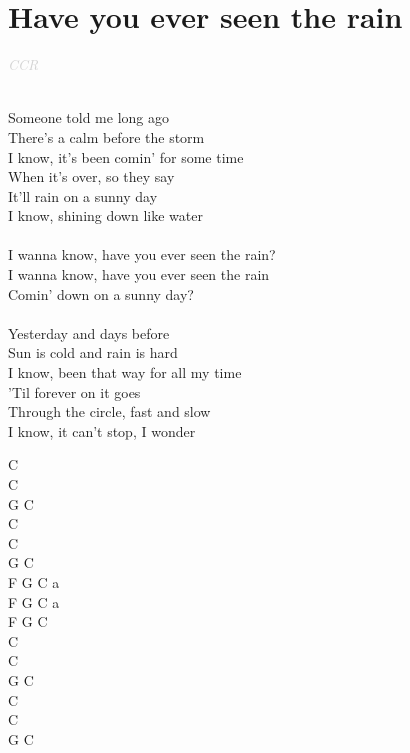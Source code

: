 \documentclass[a5paper, 10pt]{book}
\begin{document}
\section{Have you ever seen the rain}\textcolor{lightgray}{\textit{CCR}}\\~\\
\begin{minipage}[t]{0.7\textwidth}
Someone told me long ago\\
There's a calm before the storm\\
I know, it's been comin' for some time\\
When it's over, so they say\\
It'll rain on a sunny day\\
I know, shining down like water\\
\\
I wanna know, have you ever seen the rain?\\
I wanna know, have you ever seen the rain\\
Comin' down on a sunny day?\\
\\
Yesterday and days before\\
Sun is cold and rain is hard\\
I know, been that way for all my time\\
'Til forever on it goes\\
Through the circle, fast and slow\\
I know, it can't stop, I wonder\\
\end{minipage}
\begin{minipage}[t]{0.3\textwidth}
C\\ C\\
G C\\
C\\ C\\
G C\\

F G C a\\
F G C a\\
F G C\\

C\\ C\\
G C\\
C\\ C\\
G C\\
\end{minipage}

\end{document}

